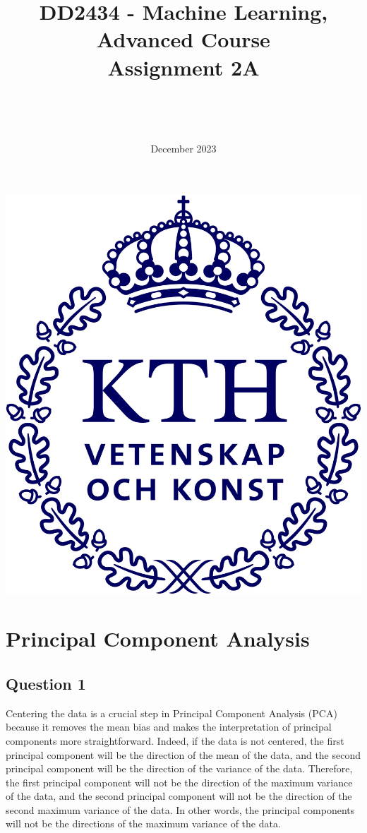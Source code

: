 \documentclass{article}
\title{DD2434 - Machine Learning, Advanced Course \\ Assignment 2A}
\author{\authorFst \\ \emailFst \and \authorSnd \\ \emailSnd}
\date{December 2023}
\begin{document}
\maketitle

\begin{center}
    \includegraphics[scale=0.5]{KTH_logo_RGB_bla.png}
\end{center}

\thispagestyle{empty}

\newpage
\tableofcontents
\newpage

\section{Principal Component Analysis}

\subsection{Question 1}

Centering the data is a crucial step in Principal Component Analysis (PCA) because it removes the mean bias and makes the interpretation of principal components more straightforward. Indeed, if the data is not centered, the first principal component will be the direction of the mean of the data, and the second principal component will be the direction of the variance of the data. Therefore, the first principal component will not be the direction of the maximum variance of the data, and the second principal component will not be the direction of the second maximum variance of the data. In other words, the principal components will not be the directions of the maximum variance of the data.
\end{document}
